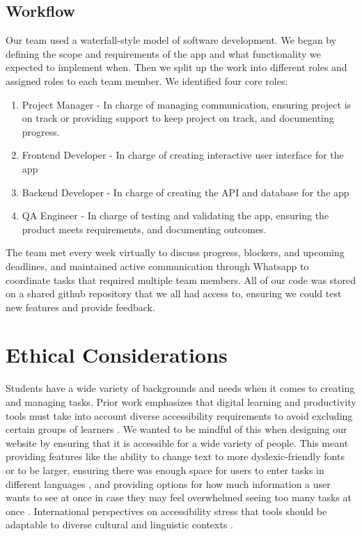\documentclass[11pt,oneside]{article}
\begin{document}
\subsection{Workflow}
Our team used a waterfall-style model of software development. We began by defining the scope and requirements of the app and what functionality we expected to implement when. Then we split up the work into different roles and assigned roles to each team member. We identified four core roles:

\begin{enumerate}
\item Project Manager - In charge of managing communication, ensuring project is on track or providing support to keep project on track, and documenting progress.
\item Frontend Developer - In charge of creating interactive user interface for the app
\item Backend Developer - In charge of creating the API and database for the app
\item QA Engineer - In charge of testing and validating the app, ensuring the product meets requirements, and documenting outcomes.
\end{enumerate}

The team met every week virtually to discuss progress, blockers, and upcoming deadlines, and maintained active communication through Whatsapp to coordinate tasks that required multiple team members. All of our code was stored on a shared github repository that we all had access to, ensuring we could test new features and provide feedback.

\section{Ethical Considerations}
Students have a wide variety of backgrounds and needs when it comes to creating and managing tasks. Prior work emphasizes that digital learning and productivity tools must take into account diverse accessibility requirements to avoid excluding certain groups of learners \citep{seale2013learning}. We wanted to be mindful of this when designing our website by ensuring that it is accessible for a wide variety of people. This meant providing features like the ability to change text to more dyslexic-friendly fonts or to be larger, ensuring there was enough space for users to enter tasks in different languages \citep{al2016universal}, and providing options for how much information a user wants to see at once in case they may feel overwhelmed seeing too many tasks at once \citep{spina2019wcag}. International perspectives on accessibility stress that tools should be adaptable to diverse cultural and linguistic contexts \citep{world2011world}.
\end{document}
